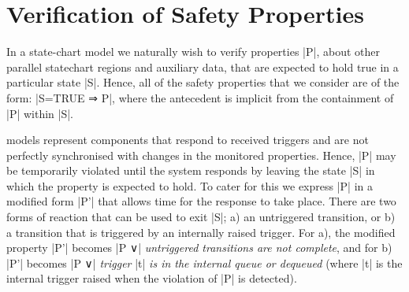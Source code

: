 

\section{Verification of Safety Properties}
\label{sec:verificationSafety}

In a state-chart model we naturally wish to verify properties |P|, about other parallel statechart regions and auxiliary data, that are expected to hold true in a particular state |S|.
Hence, all of the safety properties that we consider are of the form: |S=TRUE ⇒ P|, where the antecedent is implicit from the containment of |P| within |S|.
%

\SCXML models represent components that respond to received triggers and are not perfectly synchronised with changes in the monitored properties. 
Hence, |P| may be temporarily violated until the system responds by leaving the state |S| in which the property is expected to hold.
To cater for this we express |P| in a modified form |P'| that allows time for the response to take place.
There are two forms of reaction that can be used to exit |S|; 
a) an untriggered transition, or 
b) a transition that is triggered by an internally raised trigger.
For a), the modified property |P'| becomes |P ∨| \emph{untriggered transitions are not complete}, 
and for b) |P'| becomes |P ∨| \emph{trigger} |t| \emph{is in the internal queue or dequeued}
(where |t| is the internal trigger raised when the violation of |P| is detected).



